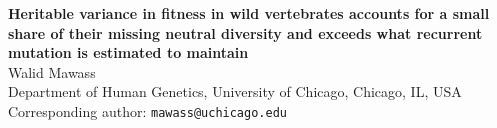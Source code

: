 \documentclass{article}
\newcommand{\beginsupplement}{%
    \setcounter{figure}{0}%
    \renewcommand{\thefigure}{S\arabic{figure}}%
    \setcounter{table}{0}%
    \renewcommand{\thetable}{S\arabic{table}}%
}
\begin{document}
\linenumbers

\begin{center}
    \LARGE
    \textbf{Heritable variance in fitness in wild vertebrates accounts for a small share of their missing neutral diversity and exceeds what recurrent mutation is estimated to maintain}\\
    \vspace{0.25cm}
    \Large
    \vspace{0.1cm}
    Walid Mawass\\
    \vspace{0.1cm}
    \small Department of Human Genetics, University of Chicago, Chicago, IL, USA\\
    \vspace{0.1cm}
    Corresponding author: \texttt{mawass@uchicago.edu}\\
\end{center}








\printbibliography
\beginsupplement


\appendix
\makeatletter
\renewcommand{\@seccntformat}[1]{\csname appfmt@#1\endcsname}
\newcommand{\appfmt@section}{Appendix \thesection:\ }
\newcommand{\appfmt@subsection}{\thesubsection\quad}
\newcommand{\appfmt@subsubsection}{\thesubsubsection\quad}
\makeatother
\renewcommand{\theequation}{\thesection\arabic{equation}}
\renewcommand{\theHequation}{app.\thesection.\arabic{equation}}




\FloatBarrier


\end{document}
